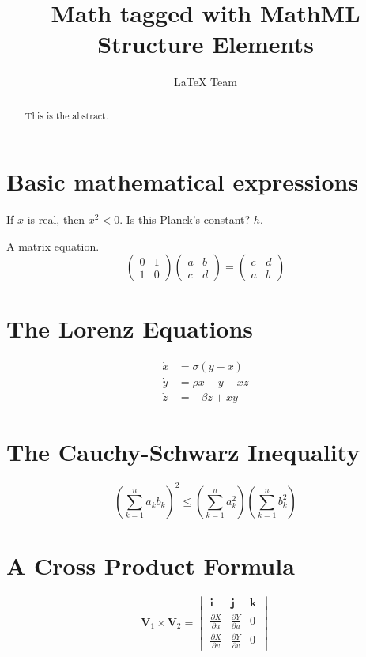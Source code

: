 \documentclass{ximera}
\title{Math tagged with MathML Structure Elements}
\author{LaTeX Team}
\begin{document}
\begin{abstract}
    This is the abstract.
\end{abstract}
\maketitle

\section{Basic mathematical expressions}

If $x$ is real, then $x^{2} < 0$. Is this Planck's constant? $h$.

A matrix equation.
\[
\begin{pmatrix}0&1\\1&0\end{pmatrix}
\begin{pmatrix}a&b\\c&d\end{pmatrix}
=
\begin{pmatrix}c&d\\a&b\end{pmatrix}
\]

\section{The Lorenz Equations}
\[\begin{aligned}
\dot{x} & = \sigma(y-x) \\
\dot{y} & = \rho x - y - xz \\
\dot{z} & = -\beta z + xy
\end{aligned} \]

\section{The Cauchy-Schwarz Inequality}
\[ \left( \sum_{k=1}^n a_k b_k \right)^2 \leq \left( \sum_{k=1}^n a_k^2 \right) \left( \sum_{k=1}^n b_k^2 \right) \]
\section{A Cross Product Formula}
\[\mathbf{V}_1 \times \mathbf{V}_2 =  \begin{vmatrix}
\mathbf{i} & \mathbf{j} & \mathbf{k} \\
\frac{\partial X}{\partial u} &  \frac{\partial Y}{\partial u} & 0 \\
\frac{\partial X}{\partial v} &  \frac{\partial Y}{\partial v} & 0
\end{vmatrix}  \]
\end{document}
